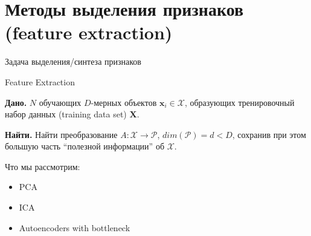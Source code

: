 \documentclass[10pt]{beamer}
\begin{document}
\section{Методы выделения признаков (feature extraction)}

\begin{frame}{Задача выделения/синтеза признаков}

\begin{block}{Feature Extraction}
\end{block}

{\bf Дано.} $N$ обучающих $D$-мерных объектов $\mathbf{x}_i \in \mathcal{X}$,
образующих тренировочный набор данных (training data set) $\mathbf{X}$.

\vspace{1em}
{\bf Найти.} Найти преобразование $A: \mathcal{X} \rightarrow
\mathcal{P}$, $dim(\mathcal{P}) = d < D$, сохранив при этом большую часть
``полезной информации'' об $\mathcal{X}$.

\vspace{1em}
Что мы рассмотрим:
\begin{itemize}
\item PCA
\item ICA
\item Autoencoders with bottleneck
\end{itemize}

\end{frame}
\end{document}
